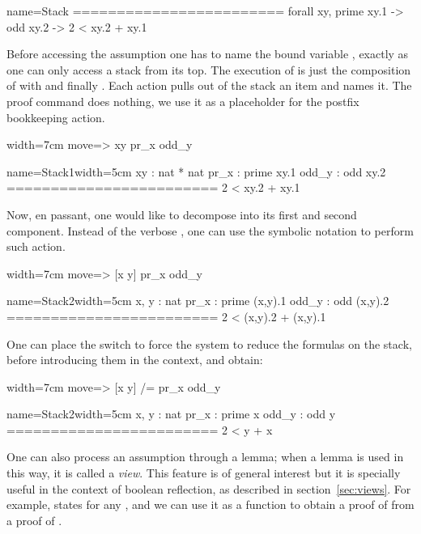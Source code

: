 \begin{coqout}{name=Stack}{}
========================
forall xy, prime xy.1 -> odd xy.2 -> 2 < xy.2 + xy.1
\end{coqout}

Before accessing the assumption  one has to name the
bound variable , exactly as one can only access a stack from its top.
The execution of  is just the composition of
 with  and finally .  Each action
pulls out of the stack an item and names it.  The  proof
command does nothing,  we use it as a placeholder
for the postfix \C{=>} bookkeeping action.

\begin{coq}{}{width=7cm}
move=> xy pr_x odd_y
\end{coq}
\begin{coqout}{name=Stack1}{width=5cm}
 xy : nat * nat
 pr_x : prime xy.1
 odd_y : odd xy.2
========================
 2 < xy.2 + xy.1
\end{coqout}

Now, en passant, one would like to decompose  into its first
and second component.  Instead of the verbose ,
one can use the symbolic notation \C{[]} to perform such action.

\begin{coq}{}{width=7cm}
move=> [x y] pr_x odd_y
\end{coq}
\begin{coqout}{name=Stack2}{width=5cm}
 x, y : nat
 pr_x : prime (x,y).1
 odd_y : odd (x,y).2
========================
 2 < (x,y).2 + (x,y).1
\end{coqout}

One can place the \C{/=} switch to force the system to reduce the formulas on
the stack, before introducing them in the context, and obtain:

\begin{coq}{}{width=7cm}
move=> [x y] /= pr_x odd_y
\end{coq}
\begin{coqout}{name=Stack2}{width=5cm}
 x, y : nat
 pr_x : prime x
 odd_y : odd y
========================
 2 < y + x
\end{coqout}

One can also process an assumption through a lemma; when a lemma is
used in this way, it is called a \emph{view}. This feature is of
general interest but it is specially useful in the context of boolean
reflection, as described in section~\ref{sec:views}. For example,
 states  for any , and we can
use it as a function to obtain a proof of   from a proof
of .


